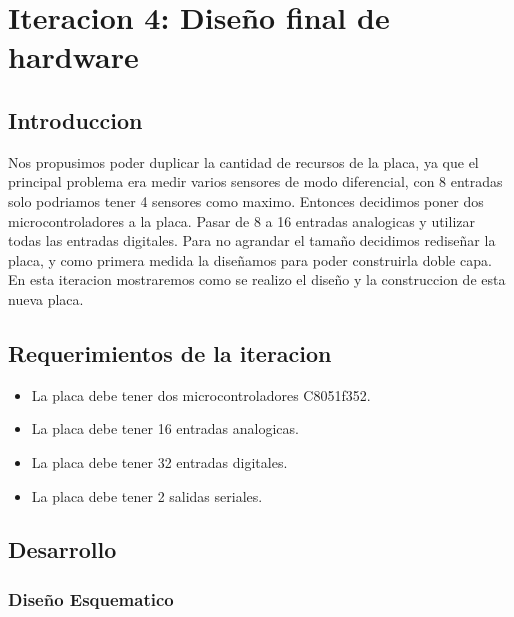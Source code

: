 \chapter{Iteracion 4: Diseño final de hardware} %
\label{cha:iteracion_4}

\section{Introduccion} %
\label{sec:introduccion}

Nos propusimos poder duplicar la cantidad de recursos de la placa, ya que el principal problema era medir varios sensores de modo diferencial, con 8 entradas solo podriamos tener 4 sensores como maximo. Entonces decidimos poner dos microcontroladores a la placa. Pasar de 8 a 16 entradas analogicas y utilizar todas las entradas digitales. 
Para no agrandar el tamaño decidimos rediseñar la placa, y como primera medida la diseñamos para poder construirla doble capa.
En esta iteracion mostraremos como se realizo el diseño y la construccion de esta nueva placa.


\section{Requerimientos de la iteracion} %
\label{sec:requerimientos_de_la_iteracion}

\begin{itemize}
	\item La placa debe tener dos microcontroladores C8051f352.
	\item La placa debe tener 16 entradas analogicas.
	\item La placa debe tener 32 entradas digitales.
	\item La placa debe tener 2 salidas seriales. 
\end{itemize}


\section{Desarrollo} %
\label{sec:desarrollo}

\subsection{Diseño Esquematico}
\label{sub: diseño_esquematico2}

